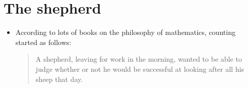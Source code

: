 \chapter{The shepherd}
\label{shepherd}

\begin{itemize}
\item
According to lots of books on the philosophy of mathematics, counting started as follows:
\begin{quote}
A shepherd, leaving for work in the morning, wanted to be able to judge whether or not he would be successful at looking after all his sheep that day.
\end{quote}
\end{itemize}

